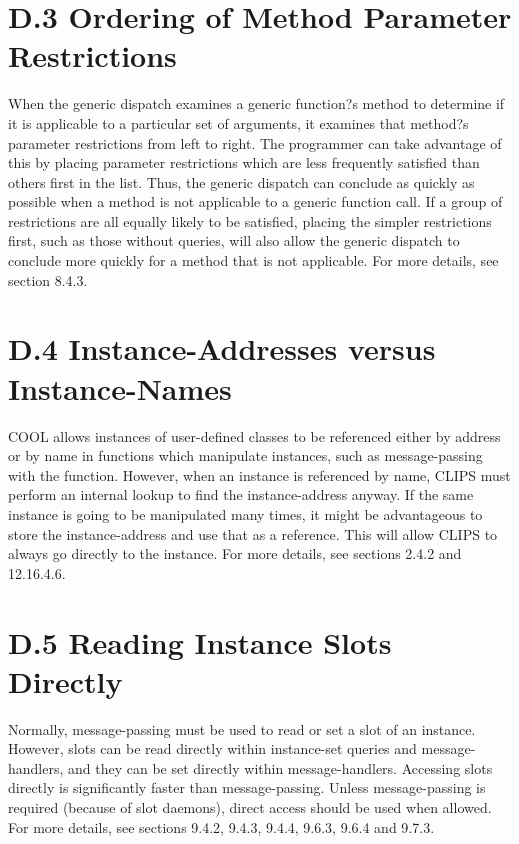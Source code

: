 \documentclass[letterpaper,10pt,english]{sphinxmanual}
\begin{document}
\section{D.3 Ordering of Method Parameter Restrictions}
\label{\detokenize{appendix:d-3-ordering-of-method-parameter-restrictions}}
When the generic dispatch examines a generic function?s method to
determine if it is applicable to a particular set of arguments, it
examines that method?s parameter restrictions from left to right. The
programmer can take advantage of this by placing parameter restrictions
which are less frequently satisfied than others first in the list. Thus,
the generic dispatch can conclude as quickly as possible when a method
is not applicable to a generic function call. If a group of restrictions
are all equally likely to be satisfied, placing the simpler restrictions
first, such as those without queries, will also allow the generic
dispatch to conclude more quickly for a method that is not applicable.
For more details, see section 8.4.3.


\section{D.4 Instance-Addresses versus Instance-Names}
\label{\detokenize{appendix:d-4-instance-addresses-versus-instance-names}}
COOL allows instances of user-defined classes to be referenced either by
address or by name in functions which manipulate instances, such as
message-passing with the  function. However, when an instance is
referenced by name, CLIPS must perform an internal lookup to find the
instance-address anyway. If the same instance is going to be manipulated
many times, it might be advantageous to store the instance-address and
use that as a reference. This will allow CLIPS to always go directly to
the instance. For more details, see sections 2.4.2 and 12.16.4.6.


\section{D.5 Reading Instance Slots Directly}
\label{\detokenize{appendix:d-5-reading-instance-slots-directly}}
Normally, message-passing must be used to read or set a slot of an
instance. However, slots can be read directly within instance-set
queries and message-handlers, and they can be set directly within
message-handlers. Accessing slots directly is significantly faster than
message-passing. Unless message-passing is required (because of slot
daemons), direct access should be used when allowed. For more details,
see sections 9.4.2, 9.4.3, 9.4.4, 9.6.3, 9.6.4 and 9.7.3.
\end{document}
